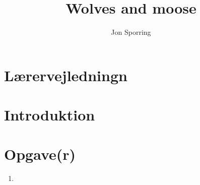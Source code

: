 \documentclass[a4paper,12pt]{article}
\title{Wolves and moose}
\author{Jon Sporring}
\begin{document}
\maketitle

\section{Lærervejledningn}

\section{Introduktion}

\section{Opgave(r)}
\begin{enumerate}
\item 
\end{enumerate}
\end{document}
